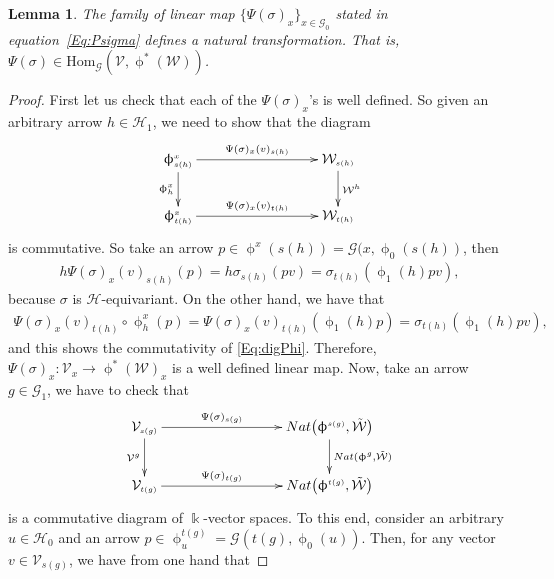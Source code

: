 \documentclass[11pt]{article}
\numberwithin{equation}{section}
\newtheorem{Lemma}[Theorem]{Lemma}
\renewcommand{\hom}[3]{\mathrm{Hom}_{\Sscript{#1}}\left(#2, #3\right)}
\newcommand{\Go}{\cG_{\Sscript{0}}}
\newcommand{\Ga}{\cG_{\Sscript{1}}}
\newcommand{\Ho}{\cH_{\Sscript{0}}}
\newcommand{\Ha}{\cH_{\Sscript{1}}}
\newcommand{\Vx}{\cV_{\Sscript{x}}}
\newcommand{\cG}{{\mathcal G}}
\newcommand{\cH}{{\mathcal H}}
\newcommand{\cV}{{\mathcal V}}
\newcommand{\cW}{{\mathcal W}}
\newcommand{\phix}{\upphi^{\Sscript{x}}}
\newcommand{\Sscript}[1]{\scriptscriptstyle{#1}}
\newcommand{\phio}{\upphi_{\Sscript{0}}}
\newcommand{\phia}{\upphi_{\Sscript{1}}}
\begin{document}
\begin{Lemma}\label{lema:Psi}The family of linear map $\{\Psi(\sigma)_{\Sscript{x}}\}_{x \in \Go}$ stated in equation~\eqref{Eq:Psigma} defines a natural transformation. That is, $\Psi(\sigma) \in \hom{\cG}{\cV}{\upphi^*(\cW)}$.
\end{Lemma}
\begin{proof}First let us check that each of the $\Psi(\sigma)_{\Sscript{x}}$'s is well defined. So given an arbitrary arrow $h \in \Ha$, we need to show that the diagram
\begin{gather}\label{Eq:digPhi}
\begin{gathered}
\xymatrix@C=40pt{ \phix_{\Sscript{s(h)}} \ar@{->}^-{\Psi(\sigma)_{\Sscript{x}}(v)_{\Sscript{s(h)}}}[rr] \ar@{->}_-{\phix_{\Sscript{h}}}[d] & & \ar@{->}^-{\cW^{\Sscript{h}}}[d] \cW_{\Sscript{s(h)}} \\ \phix_{\Sscript{t(h)}} \ar@{->}^-{\Psi(\sigma)_{\Sscript{x}}(v)_{\Sscript{t(h)}}}[rr] & & \cW_{\Sscript{t(h)}} }
\end{gathered}
\end{gather}
is commutative. So take an arrow $p \in \phix(s(h))= \cG(x,\phio(s(h))$, then
\begin{gather*}
h \Psi(\sigma)_{\Sscript{x}}(v)_{\Sscript{s(h)}}(p) = h \sigma_{\Sscript{s(h)}} (p v) =\sigma_{\Sscript{t(h)}} (\phia(h) p v),
\end{gather*}
because $\sigma$ is $\cH$-equivariant. On the other hand, we have that
\begin{gather*}
\Psi(\sigma)_{\Sscript{x}}(v)_{\Sscript{t(h)}} \circ \phix_{\Sscript{h}}(p) = \Psi(\sigma)_{\Sscript{x}}(v)_{\Sscript{t(h)}}(\upphi_{\Sscript{1}}(h)p) = \sigma_{\Sscript{t(h)}}(\upphi_{\Sscript{1}}(h)pv),
\end{gather*}
and this shows the commutativity of \eqref{Eq:digPhi}. Therefore, $\Psi(\sigma)_{\Sscript{x}}\colon \Vx \to \upphi^*(\cW)_{\Sscript{x}}$ is a well defined linear map. Now, take an arrow $ g \in \Ga$, we have to check that
\begin{gather*}
\xymatrix@C=40pt{ \cV_{\Sscript{s(g)}} \ar@{->}^-{\Psi(\sigma)_{\Sscript{s(g)}}}[rr] \ar@{->}_-{\cV^{\Sscript{g}}}[d] & & \ar@{->}^-{{\rm
Nat} (\upphi^{\Sscript{g}}, \tilde{\cW} )}[d] {\rm Nat}\big(\upphi^{\Sscript{s(g)}}, \tilde{\cW}\big) \\ \cV_{\Sscript{t(g)}} \ar@{->}^-{\Psi(\sigma)_{\Sscript{t(g)}}}[rr] & & {\rm Nat}\big(\upphi^{\Sscript{t(g)}}, \tilde{\cW}\big) }
\end{gather*}
is a commutative diagram of $\Bbbk$-vector spaces. To this end, consider an arbitrary $u \in \Ho$ and an arrow $p \in \upphi^{\Sscript{t(g)}}_{\Sscript{u}}=\cG(t(g), \upphi_{\Sscript{0}}(u))$. Then, for any vector $v \in \cV_{\Sscript{s(g)}}$, we have from one hand that

\end{proof}
\end{document}
